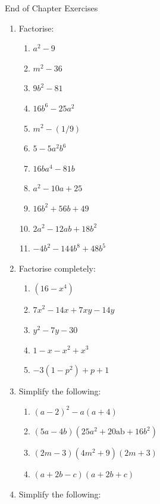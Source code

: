 \begin{eocexercises}{End of Chapter Exercises}
 \nopagebreak
      \label{m39392*id281011}\begin{enumerate}[itemsep=5pt, label=\textbf{\arabic*}. ] 
            \label{m39392*uid55}\item Factorise:
\label{m39392*id281026}\begin{enumerate}[itemsep=5pt, label=\textbf{\alph*}. ] 
            \item ${a}^{2}-9$\item ${m}^{2}-36$\item $9{b}^{2}-81$\item $16{b}^{6}-25{a}^{2}$\item ${m}^{2}-\left(1/9\right)$\item $5-5{a}^{2}{b}^{6}$\item $16b{a}^{4}-81b$\item ${a}^{2}-10a+25$\item $16{b}^{2}+56b+49$\item $2{a}^{2}-12ab+18{b}^{2}$\item $-4{b}^{2}-144{b}^{8}+48{b}^{5}$\end{enumerate}
                \label{m39392*id632}\item Factorise completely: \label{m39392*id6423}\begin{enumerate}[itemsep=5pt, label=\textbf{\alph*}. ] 
            \item $\left(16-{x}^{4}\right)$\item ${7x}^{2}-14x+7xy-14y$
\item ${y}^{2}-7y-30$
\item $1-x-{x}^{2}+{x}^{3}$
\item $-3\left(1-{p}^{2}\right)+p+1$\end{enumerate}
\item Simplify the following:
\label{m39392*eip-id1166762435067}\begin{enumerate}[itemsep=5pt, label=\textbf{\alph*}. ] 
            \item ${\left(a-2\right)}^{2}-a\left(a+4\right)$\item $\left(5a-4b\right)\left(25{a}^{2}+20\mathrm{ab}+16{b}^{2}\right)$\item $\left(2m-3\right)\left(4{m}^{2}+9\right)\left(2m+3\right)$\item $\left(a+2b-c\right)\left(a+2b+c\right)$\end{enumerate}
\item Simplify the following:
\label{m39392*eip-id1153}\begin{enumerate}[itemsep=5pt, label=\textbf{\alph*}. ] 

\end{enumerate}
\end{enumerate}
\end{eocexercises}
